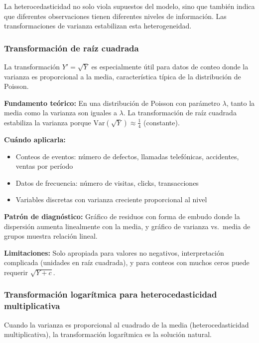 \documentclass[
  letterpaper,
  DIV=11,
  numbers=noendperiod]{scrreprt}
\providecommand{\tightlist}{%
  \setlength{\itemsep}{0pt}\setlength{\parskip}{0pt}}
\begin{document}
La heterocedasticidad no solo viola supuestos del modelo, sino que
también indica que diferentes observaciones tienen diferentes niveles de
información. Las transformaciones de varianza estabilizan esta
heterogeneidad.

\subsubsection{Transformación de raíz
cuadrada}\label{transformaciuxf3n-de-rauxedz-cuadrada}

La transformación \(Y' = \sqrt{Y}\) es especialmente útil para datos de
conteo donde la varianza es proporcional a la media, característica
típica de la distribución de Poisson.

\textbf{Fundamento teórico:} En una distribución de Poisson con
parámetro \(\lambda\), tanto la media como la varianza son iguales a
\(\lambda\). La transformación de raíz cuadrada estabiliza la varianza
porque \(\text{Var}(\sqrt{Y}) \approx \frac{1}{4}\) (constante).

\textbf{Cuándo aplicarla:}

\begin{itemize}
\tightlist
\item
  Conteos de eventos: número de defectos, llamadas telefónicas,
  accidentes, ventas por período
\item
  Datos de frecuencia: número de visitas, clicks, transacciones
\item
  Variables discretas con varianza creciente proporcional al nivel
\end{itemize}

\textbf{Patrón de diagnóstico:} Gráfico de residuos con forma de embudo
donde la dispersión aumenta linealmente con la media, y gráfico de
varianza vs.~media de grupos muestra relación lineal.

\textbf{Limitaciones:} Solo apropiada para valores no negativos,
interpretación complicada (unidades en raíz cuadrada), y para conteos
con muchos ceros puede requerir \(\sqrt{Y + c}\).

\subsubsection{Transformación logarítmica para heterocedasticidad
multiplicativa}\label{transformaciuxf3n-logaruxedtmica-para-heterocedasticidad-multiplicativa}

Cuando la varianza es proporcional al cuadrado de la media
(heterocedasticidad multiplicativa), la transformación logarítmica es la
solución natural.
\end{document}
